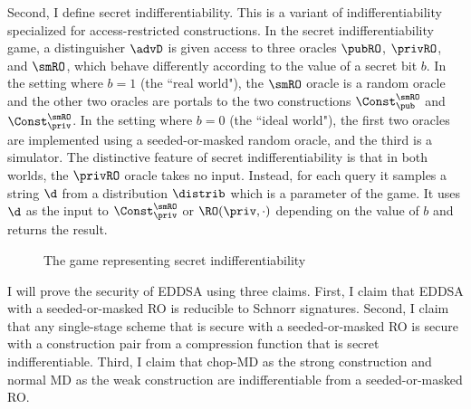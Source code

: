 Second, I define secret indifferentiability. This is a variant of indifferentiability specialized for access-restricted constructions. In the secret indifferentiability game, a distinguisher $\advD$ is given access to three oracles $\pubRO$, $\privRO$, and $\smRO$, which behave differently according to the value of a secret bit $b$.  In the setting where $b=1$ (the ``real world"), the $\smRO$ oracle is a random oracle and the other two oracles are portals to the two constructions $\Const^{\smRO}_{\pub}$ and $\Const^{\smRO}_{\priv}$. In the setting where $b=0$ (the ``ideal world"), the first two oracles are implemented using a seeded-or-masked random oracle, and the third is a simulator. The distinctive feature of secret indifferentiability is that in both worlds, the $\privRO$ oracle takes no input. Instead, for each query it samples a string $\d$ from a distribution $\distrib$ which is a parameter of the game. It uses $\d$ as the input to $\Const^{\smRO}_{\priv}$ or $\RO(\priv, \cdot)$ depending on the value of $b$ and returns the result. 

\begin{figure}
	\caption{The game representing secret indifferentiability}
\end{figure}

I will prove the security of EDDSA using three claims.
First, I claim that EDDSA with a seeded-or-masked RO is reducible to Schnorr signatures.
Second, I claim that any single-stage scheme that is secure with a seeded-or-masked RO is secure with a construction pair from a compression function that is secret indifferentiable. 
Third, I claim that chop-MD as the strong construction and normal MD as the weak construction are  indifferentiable from a seeded-or-masked RO. 


